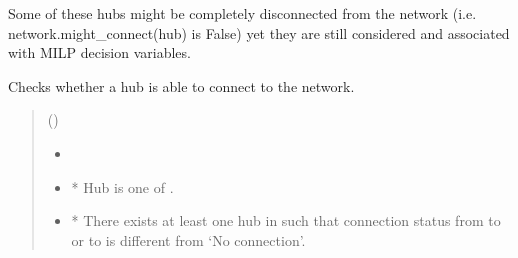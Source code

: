 \documentclass[letterpaper,10pt,english]{sphinxmanual}
\begin{document}
\begin{fulllineitems}
\begin{fulllineitems}
\sphinxAtStartPar
Some of these hubs might be completely disconnected from the network
(i.e. network.might\_connect(hub) is False) yet they are still considered and associated with MILP decision variables.

\end{fulllineitems}


\begin{fulllineitems}
\label{\detokenize{generated/tamos.network.ThermalNetwork:tamos.network.ThermalNetwork.might_connect}}
\pysigstartsignatures
{}
\pysigstopsignatures
\sphinxAtStartPar
Checks whether a hub is able to connect to the network.
\begin{quote}\begin{description}
\sphinxAtStartPar
{} ({\hyperref[\detokenize{generated/tamos.Hub:tamos.Hub}]{}}) \textendash{} 

\sphinxAtStartPar
\begin{itemize}
\item {} 
\sphinxAtStartPar
{}

\item {} 
\sphinxAtStartPar
* Hub  is one of .

\item {} 
\sphinxAtStartPar
* There exists at least one hub  in  such that connection status from  to  or  to  \textendash{} is different from ‘No connection’.

\end{itemize}


\end{description}\end{quote}

\end{fulllineitems}



\end{fulllineitems}
\end{document}
